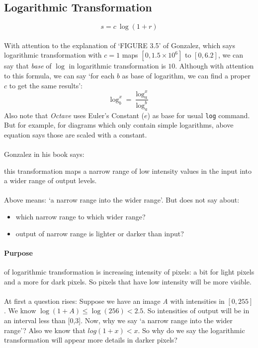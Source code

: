\subsection{Logarithmic Transformation}

\[s=c\ \log(1+r)\]
\paragraph{}\label{note:note_about_log_base}
With attention to the explanation of `FIGURE 3.5' of Gonzalez, which
says logarithmic transformation with $c=1$ maps $[0,1.5 \times 10^6]$ to
$[0,6.2]$, we can say that \emph{base} of $\log$ in logarithmic transformation
is $10$. Although with attention to this formula, we can say `for each $b$ as
base of logarithm, we can find a proper $c$ to get the same results':
\[\log_b^x=\frac{\log_a^x}{\log_a^b}\]
Also note that \emph{Octave} uses Euler's Constant ($e$) as base for usual
\texttt{log} command. But for example, for diagrams which only contain simple
logarithms,  above equation says those are scaled with a constant.
\paragraph{}Gonzalez in his book says:
\begin{displayquote}
    this transformation maps a narrow range of low intensity values in the
    input into a wider range of output levels. 
\end{displayquote}
\paragraph{}Above means: `a narrow range into the wider range'. But does not say about:
\begin{itemize}
    \item which narrow range to which wider range?
    \item output of narrow range is lighter or darker than input?
\end{itemize}
\paragraph{Purpose}\label{purpose_of_logarithmic_transformation} of 
logarithmic transformation is increasing intensity of pixels: a bit for light
pixels and a more for dark pixels. So pixels that have low intensity will be more visible. 

\paragraph{}At first a question rises: Suppose we have an image \emph{A} with
intensities in $[0,255]$. We know $\log(1+A) \leq  \log(256) < 2.5$. So
intensities of output will be in an interval less than [0,3]. Now, why we say `a
narrow range into the wider range'? Also we know that $log(1+x) < x$. So why do
we say the logarithmic transformation will appear more details in darker pixels?

